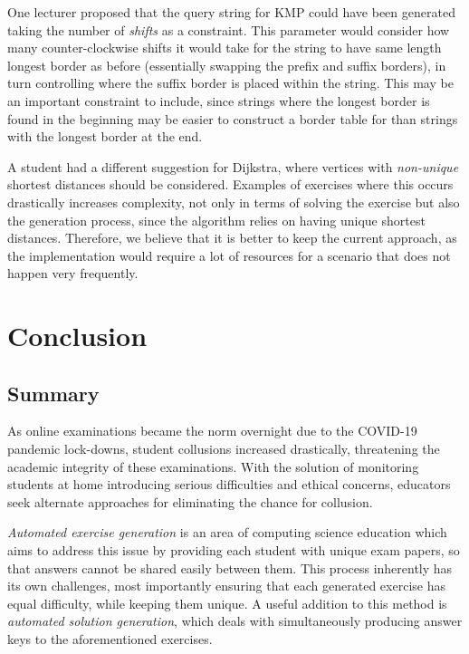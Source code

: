 \documentclass{l4proj}
\begin{document}
One lecturer proposed that the query string for KMP could have been generated taking the number of \emph{shifts} as a constraint. This parameter would consider how many counter-clockwise shifts it would take for the string to have same length longest border as before (essentially swapping the prefix and suffix borders), in turn controlling where the suffix border is placed within the string. This may be an important constraint to include, since strings where the longest border is found in the beginning may be easier to construct a border table for than strings with the longest border at the end.

A student had a different suggestion for Dijkstra, where vertices with \emph{non-unique} shortest distances should be considered. Examples of exercises where this occurs drastically increases complexity, not only in terms of solving the exercise but also the generation process, since the algorithm relies on having unique shortest distances. Therefore, we believe that it is better to keep the current approach, as the implementation would require a lot of resources for a scenario that does not happen very frequently.

\chapter{Conclusion}    
\section{Summary}

As online examinations became the norm overnight due to the COVID-19 pandemic lock-downs, student collusions increased drastically, threatening the academic integrity of these examinations. With the solution of monitoring students at home introducing serious difficulties and ethical concerns, educators seek alternate approaches for eliminating the chance for collusion.

\emph{Automated exercise generation} is an area of computing science education which aims to address this issue by providing each student with unique exam papers, so that answers cannot be shared easily between them. This process inherently has its own challenges, most importantly ensuring that each generated exercise has equal difficulty, while keeping them unique. A useful addition to this method is \emph{automated solution generation}, which deals with simultaneously producing answer keys to the aforementioned exercises.
\end{document}
